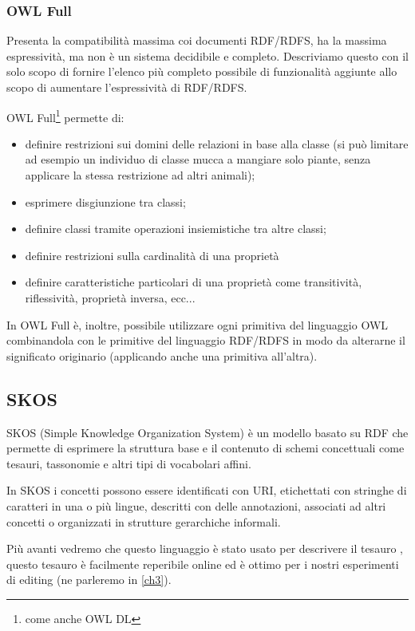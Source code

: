 \subsubsection{OWL Full}
Presenta la compatibilità massima coi documenti RDF/RDFS, ha la massima espressività, ma non è un sistema decidibile e completo. Descriviamo questo con il solo scopo di fornire l'elenco più completo possibile di funzionalità aggiunte allo scopo di aumentare l'espressività di RDF/RDFS.

OWL Full\footnote{come anche OWL DL} permette di:
\begin{itemize}
	\item definire restrizioni sui domini delle relazioni in base alla classe (si può limitare ad esempio un individuo di classe mucca a mangiare solo piante, senza applicare la stessa restrizione ad altri animali);
	\item esprimere disgiunzione tra classi;
	\item definire classi tramite operazioni insiemistiche tra altre classi;
	\item definire restrizioni sulla cardinalità di una proprietà
	\item definire caratteristiche particolari di una proprietà come transitività, riflessività, proprietà inversa, ecc...
\end{itemize}

In OWL Full è, inoltre, possibile utilizzare ogni primitiva del linguaggio OWL combinandola con le primitive del linguaggio RDF/RDFS in modo da alterarne il significato originario (applicando anche una primitiva all'altra).
\subsection{SKOS}
SKOS (Simple Knowledge Organization System) è un modello basato su RDF che permette di esprimere la struttura base e il contenuto di schemi concettuali come tesauri, tassonomie e altri tipi di vocabolari affini\cite{isaac2009skos}.

In SKOS i concetti possono essere identificati con URI, etichettati con stringhe di caratteri in una o più lingue, descritti con delle annotazioni, associati ad altri concetti o organizzati in strutture gerarchiche informali\cite{miles2009skos}.

Più avanti vedremo che questo linguaggio è stato usato per descrivere il tesauro , questo tesauro è facilmente reperibile online ed è ottimo per i nostri esperimenti di editing (ne parleremo in \ref{ch3}).